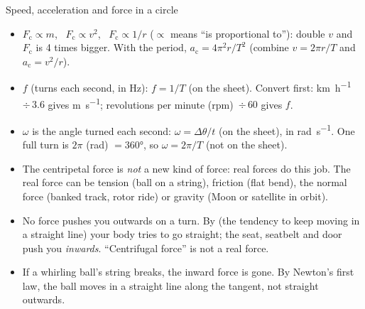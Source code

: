 \begin{formulacard}{Speed, acceleration and force in a circle}
  \begin{symbols}
  \end{symbols}
\end{formulacard}

\begin{itemize}
  \item $F_\mathrm{c} \propto m$, \ $F_\mathrm{c} \propto v^2$, \ $F_\mathrm{c} \propto 1/r$
        ($\propto$ means ``is proportional to''): double $v$ and $F_\mathrm{c}$ is 4 times
        bigger. With the period, $a_\mathrm{c} = 4\pi^2 r/T^2$ (combine $v = 2\pi r/T$ and
        $a_\mathrm{c} = v^2/r$).
  \item {} $f$ (turns each second, in \si{Hz}): $f = 1/T$ (on the sheet).
        Convert first: \si{km.h^{-1}}~$\div\, 3.6$ gives \si{m.s^{-1}}; revolutions per
        minute (rpm)~$\div\, 60$ gives $f$.
  \item {} $\omega$ is the angle turned each second:
        $\omega = \Delta\theta/t$ (on the sheet), in \si{rad.s^{-1}}. One full turn is $2\pi$
         (rad) $= \ang{360}$, so $\omega = 2\pi/T$ (not on the sheet).
  \item The centripetal force is \emph{not} a new kind of force: real forces do this job.
        The real force can be tension (ball on a string), friction (flat bend), the normal
        force (banked track, rotor ride) or gravity (Moon or satellite in orbit).
  \item No force pushes you outwards on a turn. By  (the tendency to keep
        moving in a straight line) your body tries to go straight; the seat, seatbelt and
        door push you \emph{inwards}. ``Centrifugal force'' is not a real force.
  \item If a whirling ball's string breaks, the inward force is gone. By Newton's first law,
        the ball moves in a straight line along the tangent, not straight outwards.
\end{itemize}

